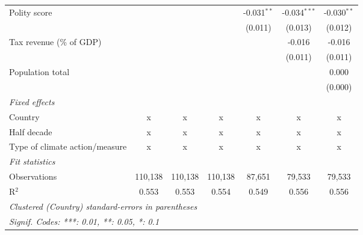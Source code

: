 \begin{tabular}{lcccccc}
   Polity score                                                  &         &                &                & -0.031$^{**}$  & -0.034$^{***}$ & -0.030$^{**}$\\   
                                                                 &         &                &                & (0.011)        & (0.013)        & (0.012)\\   
   Tax revenue (\% of GDP)                                       &         &                &                &                & -0.016         & -0.016\\   
                                                                 &         &                &                &                & (0.011)        & (0.011)\\   
   Population total                                              &         &                &                &                &                & 0.000\\   
                                                                 &         &                &                &                &                & (0.000)\\   
   \emph{Fixed effects}\\
   Country                                                       & x       & x              & x              & x              & x              & x\\  
   Half decade                                                   & x       & x              & x              & x              & x              & x\\  
   Type of climate action/measure                                & x       & x              & x              & x              & x              & x\\  
   \midrule \emph{Fit statistics}\\
   Observations                                                  & 110,138 & 110,138        & 110,138        & 87,651         & 79,533         & 79,533\\  
   R$^2$                                                         & 0.553   & 0.553          & 0.554          & 0.549          & 0.556          & 0.556\\  
   \midrule
   \multicolumn{7}{l}{\emph{Clustered (Country) standard-errors in parentheses}}\\
   \multicolumn{7}{l}{\emph{Signif. Codes: ***: 0.01, **: 0.05, *: 0.1}}\\
\end{tabular}
\par\endgroup


